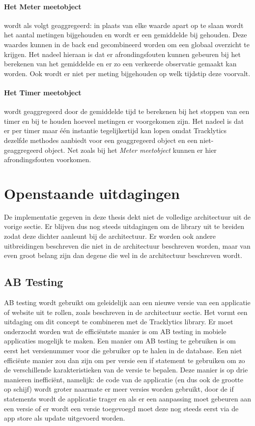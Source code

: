 \paragraph{Het Meter meetobject} wordt als volgt geaggregeerd: in plaats van elke waarde apart op te slaan wordt het aantal metingen bijgehouden en wordt er een gemiddelde bij gehouden. Deze waardes kunnen in de back end gecombineerd worden om een globaal overzicht te krijgen. Het nadeel hieraan is dat er afrondingsfouten kunnen gebeuren bij het berekenen van het gemiddelde en er zo een verkeerde observatie gemaakt kan worden. Ook wordt er niet per meting bijgehouden op welk tijdstip deze voorvalt. \\

\paragraph{Het Timer meetobject} wordt geaggregeerd door de gemiddelde tijd te berekenen bij het stoppen van een timer en bij te houden hoeveel metingen er voorgekomen zijn. Het nadeel is dat er per timer maar \'e\'en instantie tegelijkertijd kan lopen omdat Tracklytics dezelfde methodes aanbiedt voor een geaggregeerd object en een niet-geaggregeerd object. Net zoals bij het \textit{Meter meetobject} kunnen er hier afrondingsfouten voorkomen. \\



\section{Openstaande uitdagingen}
De implementatie gegeven in deze thesis dekt niet de volledige architectuur uit de vorige sectie. Er blijven dus nog steeds uitdagingen om de library uit te breiden zodat deze dichter aanleunt bij de architectuur. Er worden ook andere uitbreidingen beschreven die niet in de architectuur beschreven worden, maar van even groot belang zijn dan degene die wel in de architectuur beschreven wordt. 

\subsection{AB Testing}
AB testing wordt gebruikt om geleidelijk aan een nieuwe versie van een applicatie of website uit te rollen, zoals beschreven in de architectuur sectie. Het vormt een uitdaging om dit concept te combineren met de Tracklytics library. Er moet onderzocht worden wat de effici\"entste manier is om AB testing in mobiele applicaties mogelijk te maken.  Een manier om AB testing te gebruiken is om eerst het versienummer voor die gebruiker op te halen in de database. Een niet effici\"ente manier zou dan zijn om per versie een if statement te gebruiken om zo de verschillende karakteristieken van de versie te bepalen. Deze manier is op drie manieren ineffici\"ent, namelijk: de code van de applicatie (en dus ook de grootte op schijf) wordt groter naarmate er meer versies worden gebruikt, door de if statements wordt de applicatie trager en als er een aanpassing moet gebeuren aan een versie of er wordt een versie toegevoegd moet deze nog steeds eerst via de app store als update uitgevoerd worden.


